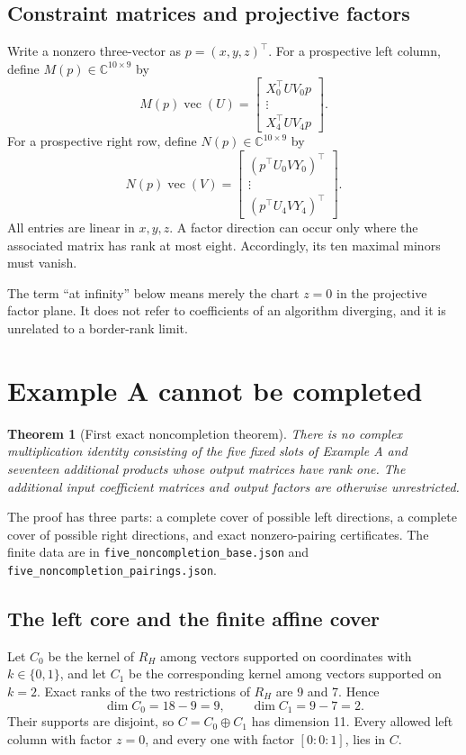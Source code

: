 \documentclass[11pt]{article}
\newtheorem{theorem}{Theorem}[section]
\theoremstyle{definition}\newtheorem{definition}[theorem]{Definition}
\newcommand{\C}{\mathbb C}\newcommand{\Q}{\mathbb Q}
\newcommand{\vecm}{\operatorname{vec}}
\newcommand{\file}[1]{\nolinkurl{#1}}
\begin{document}
\subsection{Constraint matrices and projective factors}
Write a nonzero three-vector as $p=(x,y,z)^\top$. For a prospective left column, define $M(p)\in\C^{10\times9}$ by
\begin{equation}\label{eq:M}
M(p)\vecm(U)=\begin{bmatrix}X_0^\top UV_0p\\\vdots\\X_4^\top UV_4p\end{bmatrix}.
\end{equation}
For a prospective right row, define $N(p)\in\C^{10\times9}$ by
\begin{equation}\label{eq:N}
N(p)\vecm(V)=\begin{bmatrix}(p^\top U_0VY_0)^\top\\\vdots\\(p^\top U_4VY_4)^\top\end{bmatrix}.
\end{equation}
All entries are linear in $x,y,z$. A factor direction can occur only where the associated matrix has rank at most eight. Accordingly, its ten maximal minors must vanish.

The term ``at infinity'' below means merely the chart $z=0$ in the projective factor plane. It does not refer to coefficients of an algorithm diverging, and it is unrelated to a border-rank limit.

\section{Example A cannot be completed}\label{sec:noncompA}
\begin{theorem}[First exact noncompletion theorem]\label{thm:noncompA}
There is no complex multiplication identity consisting of the five fixed slots of Example A and seventeen additional products whose output matrices have rank one. The additional input coefficient matrices and output factors are otherwise unrestricted.
\end{theorem}
The proof has three parts: a complete cover of possible left directions, a complete cover of possible right directions, and exact nonzero-pairing certificates. The finite data are in \file{five_noncompletion_base.json} and \file{five_noncompletion_pairings.json}.

\subsection{The left core and the finite affine cover}
Let $C_0$ be the kernel of $R_H$ among vectors supported on coordinates with $k\in\{0,1\}$, and let $C_1$ be the corresponding kernel among vectors supported on $k=2$. Exact ranks of the two restrictions of $R_H$ are 9 and 7. Hence
\[
\dim C_0=18-9=9,\qquad \dim C_1=9-7=2.
\]
Their supports are disjoint, so $C=C_0\oplus C_1$ has dimension 11. Every allowed left column with factor $z=0$, and every one with factor $[0:0:1]$, lies in $C$.
\end{document}
